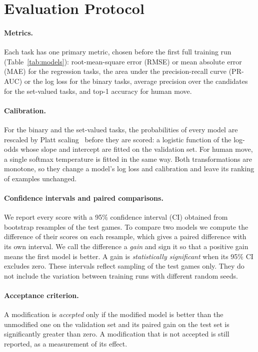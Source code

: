 \documentclass[11pt]{article}
\begin{document}
\section{Evaluation Protocol}
\label{sec:protocol}

\paragraph{Metrics.}
Each task has one primary metric, chosen before the first full training run
(Table~\ref{tab:models}): root-mean-square error (RMSE) or mean absolute error
(MAE) for the regression tasks, the area under the precision-recall curve
(PR-AUC) or the log loss for the binary tasks, average precision over the
candidates for the set-valued tasks, and top-1 accuracy for human move.

\paragraph{Calibration.}
For the binary and the set-valued tasks, the probabilities of every model are
rescaled by Platt scaling~\cite{platt} before they are scored: a logistic
function of the log-odds whose slope and intercept are fitted on the
validation set. For human move, a single softmax temperature is fitted in the
same way. Both transformations are monotone, so they change a model's log
loss and calibration and leave its ranking of examples unchanged.

\paragraph{Confidence intervals and paired comparisons.}
We report every score with a 95\% confidence interval (CI) obtained from
 bootstrap resamples of the test games. To compare two
models we compute the difference of their scores on each resample, which
gives a paired difference with its own interval. We call the difference a
\emph{gain} and sign it so that a positive gain means the first model is
better. A gain is \emph{statistically significant} when its 95\% CI excludes
zero. These intervals reflect sampling of the test games only. They do not
include the variation between training runs with different random seeds.

\paragraph{Acceptance criterion.}
A modification is \emph{accepted} only if the modified model is better than
the unmodified one on the validation set and its paired gain on the test set
is significantly greater than zero. A modification that is not accepted is
still reported, as a measurement of its effect.
\end{document}
